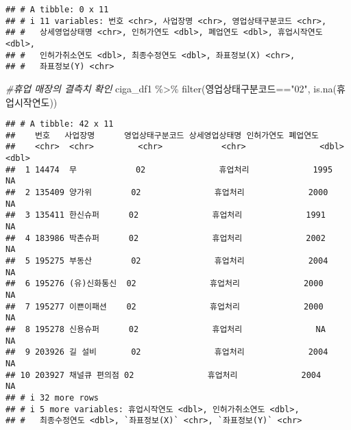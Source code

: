 \documentclass[
]{book}
\newenvironment{Shaded}{\begin{snugshade}}{\end{snugshade}}
\newcommand{\CommentTok}[1]{\textcolor[rgb]{0.56,0.35,0.01}{\textit{#1}}}
\newcommand{\FunctionTok}[1]{\textcolor[rgb]{0.00,0.00,0.00}{#1}}
\newcommand{\NormalTok}[1]{#1}
\newcommand{\OtherTok}[1]{\textcolor[rgb]{0.56,0.35,0.01}{#1}}
\newcommand{\SpecialCharTok}[1]{\textcolor[rgb]{0.00,0.00,0.00}{#1}}
\newcommand{\StringTok}[1]{\textcolor[rgb]{0.31,0.60,0.02}{#1}}
\begin{document}
\begin{verbatim}
## # A tibble: 0 x 11
## # i 11 variables: 번호 <chr>, 사업장명 <chr>, 영업상태구분코드 <chr>,
## #   상세영업상태명 <chr>, 인허가연도 <dbl>, 폐업연도 <dbl>, 휴업시작연도 <dbl>,
## #   인허가취소연도 <dbl>, 최종수정연도 <dbl>, 좌표정보(X) <chr>,
## #   좌표정보(Y) <chr>
\end{verbatim}

\begin{Shaded}
\begin{Highlighting}[]
\CommentTok{\#휴업 매장의 결측치 확인}
\NormalTok{ciga\_df1 }\SpecialCharTok{\%\textgreater{}\%} 
  \FunctionTok{filter}\NormalTok{(영업상태구분코드}\SpecialCharTok{==}\StringTok{"02"}\NormalTok{, }\FunctionTok{is.na}\NormalTok{(휴업시작연도))}
\end{Highlighting}
\end{Shaded}

\begin{verbatim}
## # A tibble: 42 x 11
##    번호   사업장명      영업상태구분코드 상세영업상태명 인허가연도 폐업연도
##    <chr>  <chr>         <chr>            <chr>               <dbl>    <dbl>
##  1 14474  무            02               휴업처리             1995       NA
##  2 135409 양가위        02               휴업처리             2000       NA
##  3 135411 한신슈퍼      02               휴업처리             1991       NA
##  4 183986 박촌슈퍼      02               휴업처리             2002       NA
##  5 195275 부동산        02               휴업처리             2004       NA
##  6 195276 (유)신화통신  02               휴업처리             2000       NA
##  7 195277 이쁜이패션    02               휴업처리             2000       NA
##  8 195278 신용슈퍼      02               휴업처리               NA       NA
##  9 203926 길 설비       02               휴업처리             2004       NA
## 10 203927 채널큐 편의점 02               휴업처리             2004       NA
## # i 32 more rows
## # i 5 more variables: 휴업시작연도 <dbl>, 인허가취소연도 <dbl>,
## #   최종수정연도 <dbl>, `좌표정보(X)` <chr>, `좌표정보(Y)` <chr>
\end{verbatim}

\begin{Shaded}
\end{Shaded}
\end{document}
